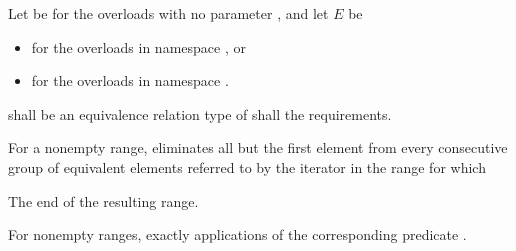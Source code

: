 \begin{itemdescr}
\begin{addedblock}
\pnum
Let  be  for the overloads with no
parameter , and let $E$ be
\begin{itemize}
\item {}
  for the overloads in namespace , or
\item {}
  for the overloads in namespace .
\end{itemize}
\end{addedblock}

\pnum
\requires
{}  shall be
an equivalence relation
type of  shall  the
 requirements.

\pnum
\effects
For a nonempty range, eliminates all but the first element from every
consecutive group of equivalent elements referred to by the iterator
in the range
for which  

\pnum
\returns
The end of the resulting range.

\pnum
\complexity
For nonempty ranges, exactly
applications of the corresponding predicate .
\end{itemdescr}


